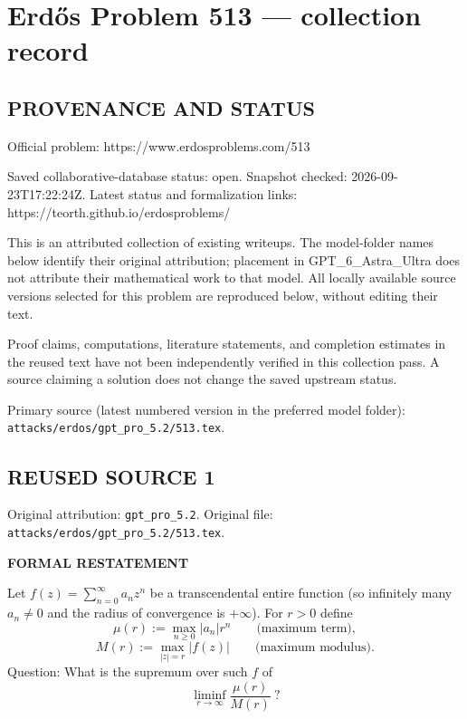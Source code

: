 \section*{Erd\H{o}s Problem 513 --- collection record}

\subsection*{PROVENANCE AND STATUS}
Official problem: https://www.erdosproblems.com/513

Saved collaborative-database status: open.
Snapshot checked: 2026-09-23T17:22:24Z.
Latest status and formalization links: https://teorth.github.io/erdosproblems/

This is an attributed collection of existing writeups. The model-folder names below identify their original attribution; placement in GPT\_6\_Astra\_Ultra does not attribute their mathematical work to that model. All locally available source versions selected for this problem are reproduced below, without editing their text.

Proof claims, computations, literature statements, and completion estimates in the reused text have not been independently verified in this collection pass. A source claiming a solution does not change the saved upstream status.

Primary source (latest numbered version in the preferred model folder): \texttt{attacks/erdos/gpt\_pro\_5.2/513.tex}.

\subsection*{REUSED SOURCE 1}
Original attribution: \texttt{gpt\_pro\_5.2}.
Original file: \texttt{attacks/erdos/gpt\_pro\_5.2/513.tex}.

\noindent\textbf{FORMAL RESTATEMENT}

Let $f(z)=\sum_{n=0}^{\infty} a_n z^n$ be a transcendental entire function (so infinitely many $a_n\neq 0$ and the radius of convergence is $+\infty$). For $r>0$ define
\[
\mu(r):=\max_{n\ge 0} |a_n| r^n\qquad\text{(maximum term)},
\]
\[
M(r):=\max_{|z|=r} |f(z)|\qquad\text{(maximum modulus)}.
\]
Question: What is the supremum over such $f$ of
\[
\liminf_{r\to\infty} \frac{\mu(r)}{M(r)}\ ?
\]

